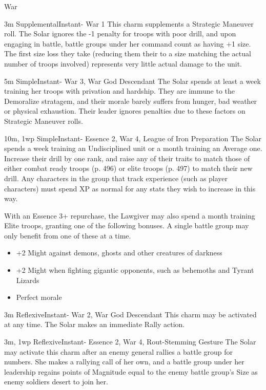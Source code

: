 \begin{Ability}{War}

  {3m}
  {Supplemental}{Instant}{-}
  {War 1}
  This charm supplements a Strategic Maneuver roll. The Solar ignores the -1 penalty for troops with poor drill, and upon engaging in battle, battle groups under her command count as having +1 size. The first size loss they take (reducing them their to a size matching the actual number of troops involved) represents very little actual damage to the unit.

  {5m}
  {Simple}{Instant}{-}
  {War 3, War God Descendant}
  The Solar spends at least a week training her troops with privation and hardship. They are immune to the Demoralize stratagem, and their morale barely suffers from hunger, bad weather or physical exhaustion. Their leader ignores penalties due to these factors on Strategic Maneuver rolls.

  {10m, 1wp}
  {Simple}{Instant}{-}
  {Essence 2, War 4, League of Iron Preparation}
  The Solar spends a week training an Undisciplined unit or a month training an Average one. Increase their drill by one rank, and raise any of their traits to match those of either combat ready troops (p. 496) or elite troops (p. 497) to match their new drill. Any characters in the group that track experience (such as player characters) must spend XP as normal for any stats they wish to increase in this way.

  With an Essence 3+ repurchase, the Lawgiver may also spend a month training Elite troops, granting one of the following bonuses. A single battle group may only benefit from one of these at a time.
  \begin{itemize}
    \item +2 Might against demons, ghosts and other creatures of darkness
    \item +2 Might when fighting gigantic opponents, such as behemoths and Tyrant Lizards
    \item Perfect morale
  \end{itemize}

  {3m}
  {Reflexive}{Instant}{-}
  {War 2, War God Descendant}
  This charm may be activated at any time. The Solar makes an immediate Rally action.

  {3m, 1wp}
  {Reflexive}{Instant}{-}
  {Essence 2, War 4, Rout-Stemming Gesture}
  The Solar may activate this charm after an enemy general rallies a battle group for numbers. She makes a rallying call of her own, and a battle group under her leadership regains points of Magnitude equal to the enemy battle group's Size as enemy soldiers desert to join her.


\end{Ability}
